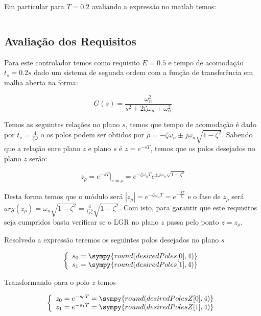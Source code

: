 \documentclass[a4paper,11pt]{article}
\begin{document}
Em particular para $T=0.2$ avaliando a expressão no matlab temos:

$$$$

\subsection{Avaliação dos Requisitos}

Para este controlador temos como requisito $E=0.5$ e tempo de acomodação $t_s = 0.2s$ dado um sistema de segunda ordem com a função de transferência em malha aberta na forma:

\begin{equation}
    G(s) = \frac{\omega_n^2}{s^2 + 2\zeta\omega_n + \omega_n^2}
\end{equation}

Temos as seguintes relações no plano $s$, temos que tempo de acomodação é dado por $t_s = \frac{4}{\zeta\omega}$
o os polos podem ser obtidos por $ \rho = -\zeta\omega_n \pm j\omega_n\sqrt{1-\zeta^2}$. Sabendo que a relação enre plano $z$ e plano $s$ é $z=e^{-sT}$, temos que os polos desejados no plano $z$ serâo:

\begin{equation}
    z_{\rho} = e^{-sT}|_{s=\rho} =  e^{-\zeta\omega_n T} e^{\pm j\omega_n\sqrt{1-\zeta^2}}
\end{equation}

Desta forma temos que o módulo será $|z_{\rho}| =  e^{-\zeta\omega_n T} = e^{-\frac{4T}{t_s}}$ e o fase de $z_\rho$ será $arg(z_{\rho}) = \omega_n\sqrt{1-\zeta^2} = \frac{4}{t_s\zeta}\sqrt{1-\zeta^2}$. Com isto, para garantir que este requisitos seja cumpridos basta verificar se o LGR no plano $z$ passa pelo ponto $z = z_{\rho}$.

Resolvedo a expressão teremos os seguintes polos desejados no plano $s$

$$
\left\{
\begin{array}{l}
    s_0 = \sympy{round(desiredPoles[0],4)}\\
    s_1 = \sympy{round(desiredPoles[1],4)}
\end{array}
\right.
$$

Transformando para o polo $z$ temos

$$
\left\{
\begin{array}{l}
    z_0 = e^{-s_0 T} = \sympy{round(desiredPolesZ[0],4)}\\
    z_1 = e^{-s_1 T} = \sympy{round(desiredPolesZ[1],4)}
\end{array}
\right.
$$
\end{document}
